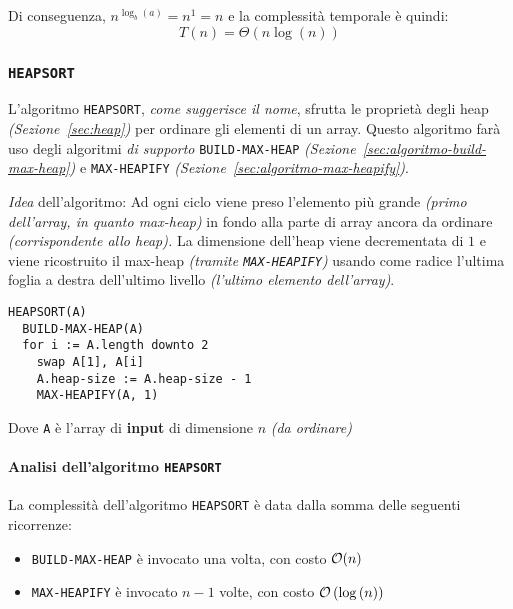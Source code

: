 \documentclass[italian, 10pt]{article}
\begin{document}
Di conseguenza, \(n^{\log_b(a)} = n^1 = n\) e la complessità temporale è quindi:
\[ T(n) = \Theta(n \log{(n)}) \]

\subsubsection{\texttt{HEAPSORT}}
\label{sec:heap-sort}

L'algoritmo \texttt{HEAPSORT}, \textit{come suggerisce il nome}, sfrutta le proprietà degli heap \textit{(Sezione~\ref{sec:heap})} per ordinare gli elementi di un array.
Questo algoritmo farà uso degli algoritmi \textit{di supporto} \texttt{BUILD-MAX-HEAP} \textit{(Sezione~\ref{sec:algoritmo-build-max-heap})} e \texttt{MAX-HEAPIFY} \textit{(Sezione~\ref{sec:algoritmo-max-heapify})}.

\bigskip
\textit{Idea} dell'algoritmo:
Ad ogni ciclo viene preso l'elemento più grande \textit{(primo dell'array, in quanto max-heap)} in fondo alla parte di array ancora da ordinare \textit{(corrispondente allo heap).}
La dimensione dell'heap viene decrementata di \(1\) e viene ricostruito il max-heap \textit{(tramite \texttt{MAX-HEAPIFY})} usando come radice l'ultima foglia a destra dell'ultimo livello \textit{(l'ultimo elemento dell'array)}.

\begin{lstlisting}[style=pseudocode, caption={Pseudocodice dell'algoritmo \texttt{HEAPSORT}}, label={sec:algoritmo-heapsort}]
HEAPSORT(A)
  BUILD-MAX-HEAP(A)
  for i := A.length downto 2
    swap A[1], A[i]
    A.heap-size := A.heap-size - 1
    MAX-HEAPIFY(A, 1)
\end{lstlisting}

Dove \texttt{A} è l'array di \textbf{input} di dimensione \(n\) \textit{(da ordinare)}

\paragraph{Analisi dell'algoritmo \texttt{HEAPSORT}}

La complessità dell'algoritmo \texttt{HEAPSORT} è data dalla somma delle seguenti ricorrenze:

\begin{itemize}
  \item \texttt{BUILD-MAX-HEAP} è invocato una volta, con costo \(\mathcal{O}(n)\)
  \item \texttt{MAX-HEAPIFY} è invocato \(n-1\) volte, con costo \(\mathcal{O}\left(\log{(n)}\right)\)
\end{itemize}
\end{document}
